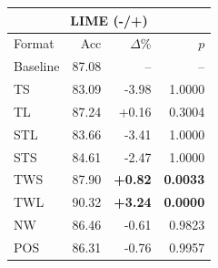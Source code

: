 \begin{tabular}{lrrr}
\toprule
\multicolumn{4}{c}{\textbf{LIME (-/+)}} \\
\midrule
Format & Acc & $\Delta$\% & $p$ \\
\midrule
Baseline & 87.08 & -- & -- \\
\midrule
TS & 83.09 & -3.98 & 1.0000 \\
TL & 87.24 & +0.16 & 0.3004 \\
STL & 83.66 & -3.41 & 1.0000 \\
STS & 84.61 & -2.47 & 1.0000 \\
TWS & 87.90 & \textbf{+0.82} & \textbf{0.0033} \\
TWL & 90.32 & \textbf{+3.24} & \textbf{0.0000} \\
NW & 86.46 & -0.61 & 0.9823 \\
POS & 86.31 & -0.76 & 0.9957 \\
\bottomrule
\end{tabular}
